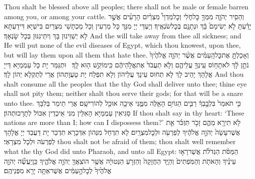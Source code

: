 {Thou shalt be blessed above all peoples; there shall not be male or female barren among you, or among your cattle.}{}
{וְהֵסִ֧יר יְהֹוָ֛ה מִמְּךָ֖ כׇּל\maqqaf חֹ֑לִי וְכׇל\maqqaf מַדְוֵי֩ מִצְרַ֨יִם הָרָעִ֜ים אֲשֶׁ֣ר יָדַ֗עְתָּ לֹ֤א יְשִׂימָם֙ בָּ֔ךְ וּנְתָנָ֖ם בְּכׇל\maqqaf שֹׂנְאֶֽיךָ׃}
{וְיַעְדֵּי יְיָ מִנָּךְ כָּל מַרְעִין וְכָל מַכְתָּשֵׁי מִצְרַיִם בִּישַׁיָּא דִּידַעְתָּא לָא יְשַׁוֵּינוּן בָּךְ וְיִתֵּינִנּוּן בְּכָל שָׂנְאָךְ׃}
{And the \lord\space will take away from thee all sickness; and He will put none of the evil diseases of Egypt, which thou knowest, upon thee, but will lay them upon all them that hate thee.}{}
{וְאָכַלְתָּ֣ אֶת\maqqaf כׇּל\maqqaf הָֽעַמִּ֗ים אֲשֶׁ֨ר יְהֹוָ֤ה אֱלֹהֶ֙יךָ֙ נֹתֵ֣ן לָ֔ךְ לֹא\maqqaf תָח֥וֹס עֵֽינְךָ֖ עֲלֵיהֶ֑ם וְלֹ֤א תַעֲבֹד֙ אֶת\maqqaf אֱלֹ֣הֵיהֶ֔ם כִּֽי\maqqaf מוֹקֵ֥שׁ ה֖וּא לָֽךְ׃ \setuma }
{וּתְגַּמַּר יָת כָּל עַמְמַיָּא דַּייָ אֱלָהָךְ יָהֵיב לָךְ לָא תְחוּס עֵינָךְ עֲלֵיהוֹן וְלָא תִפְלַח יָת טָעֲוָתְהוֹן אֲרֵי לְתַקְלָא יְהוֹן לָךְ׃}
{And thou shalt consume all the peoples that the \lord\space thy God shall deliver unto thee; thine eye shall not pity them; neither shalt thou serve their gods; for that will be a snare unto thee.}{}
{כִּ֤י תֹאמַר֙ בִּלְבָ֣בְךָ֔ רַבִּ֛ים הַגּוֹיִ֥ם הָאֵ֖לֶּה מִמֶּ֑נִּי אֵיכָ֥ה אוּכַ֖ל לְהוֹרִישָֽׁם׃}
{אֲרֵי תֵימַר בְּלִבָּךְ סַגִּיאִין עַמְמַיָּא הָאִלֵּין מִנִּי אֵיכְדֵין אִכּוֹל לְתָרָכוּתְהוֹן׃}
{If thou shalt say in thy heart: ‘These nations are more than I; how can I dispossess them?’}{}
{לֹ֥א תִירָ֖א מֵהֶ֑ם זָכֹ֣ר תִּזְכֹּ֗ר אֵ֤ת אֲשֶׁר\maqqaf עָשָׂה֙ יְהֹוָ֣ה אֱלֹהֶ֔יךָ לְפַרְעֹ֖ה וּלְכׇל\maqqaf מִצְרָֽיִם׃}
{לָא תִדְחַל מִנְּהוֹן אִדְּכָרָא תִדְכַר יָת דַּעֲבַד יְיָ אֱלָהָךְ לְפַרְעֹה וּלְכָל מִצְרָאֵי׃}
{thou shalt not be afraid of them; thou shalt well remember what the \lord\space thy God did unto Pharaoh, and unto all Egypt:}{}
{הַמַּסֹּ֨ת הַגְּדֹלֹ֜ת אֲשֶׁר\maqqaf רָא֣וּ עֵינֶ֗יךָ וְהָאֹתֹ֤ת וְהַמֹּֽפְתִים֙ וְהַיָּ֤ד הַחֲזָקָה֙ וְהַזְּרֹ֣עַ הַנְּטוּיָ֔ה אֲשֶׁ֥ר הוֹצִֽאֲךָ֖ יְהֹוָ֣ה אֱלֹהֶ֑יךָ כֵּֽן\maqqaf יַעֲשֶׂ֞ה יְהֹוָ֤ה אֱלֹהֶ֙יךָ֙ לְכׇל\maqqaf הָ֣עַמִּ֔ים אֲשֶׁר\maqqaf אַתָּ֥ה יָרֵ֖א מִפְּנֵיהֶֽם׃}
